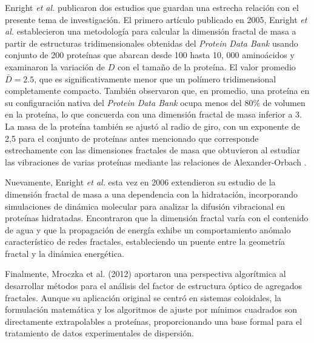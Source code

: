 Enright \textit{et al.} publicaron dos estudios que guardan una estrecha relación con el presente tema de investigación. El primero artículo publicado en 2005, Enright \textit{et al.}
\cite{Enright2005} establecieron una metodología  para calcular la dimensión fractal de masa a partir de estructuras tridimensionales obtenidas del \textit{Protein Data Bank} usando conjunto de 200 proteínas que abarcan desde 100 hasta 10, 000 aminoácidos y examinaron la variación de $D$ con el tamaño de la proteína. El valor promedio $\bar{D} = 2.5$, que es significativamente menor que un polímero tridimensional completamente compacto. También observaron que, en promedio, una proteína en su configuración nativa del \textit{Protein Data Bank} ocupa menos del $80\%$ de volumen en la proteína, lo que concuerda con una dimensión fractal de masa inferior a 3. La masa de la proteína también se ajustó al radio de giro, con un exponente de 2,5 para el conjunto de proteínas antes mencionado que corresponde estrechamente con las dimensiones fractales de masa que obtuvieron al estudiar las vibraciones de varias proteínas mediante las relaciones de Alexander-Orbach \cite{Alexander1982}.

Nuevamente, Enright \textit{et al.}\cite{Enright2006} esta vez en 2006 extendieron su estudio de la dimensión fractal de masa a una dependencia con la hidratación, incorporando simulaciones de dinámica molecular para analizar la difusión vibracional en proteínas hidratadas. Encontraron que la dimensión fractal varía con el contenido de agua y que la propagación de energía exhibe un comportamiento anómalo característico de redes fractales, estableciendo un puente entre la geometría fractal y la dinámica energética.

Finalmente, Mroczka et al. (2012)\cite{Mroczka2012} aportaron una perspectiva algorítmica al desarrollar métodos para el análisis del factor de estructura óptico de agregados fractales. Aunque su aplicación original se centró en sistemas coloidales, la formulación matemática y los algoritmos de ajuste por mínimos cuadrados son directamente extrapolables a proteínas, proporcionando una base formal para el tratamiento de datos experimentales de dispersión.

\color{black}
